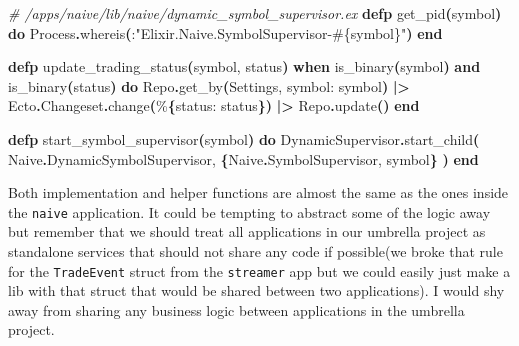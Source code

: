 \documentclass[
  oneside]{book}
\newenvironment{Shaded}{\begin{snugshade}}{\end{snugshade}}
\newcommand{\CommentTok}[1]{\textcolor[rgb]{0.56,0.35,0.01}{\textit{#1}}}
\newcommand{\ConstantTok}[1]{\textcolor[rgb]{0.56,0.35,0.01}{#1}}
\newcommand{\FunctionTok}[1]{\textcolor[rgb]{0.13,0.29,0.53}{\textbf{#1}}}
\newcommand{\KeywordTok}[1]{\textcolor[rgb]{0.13,0.29,0.53}{\textbf{#1}}}
\newcommand{\NormalTok}[1]{#1}
\newcommand{\OperatorTok}[1]{\textcolor[rgb]{0.81,0.36,0.00}{\textbf{#1}}}
\newcommand{\OtherTok}[1]{\textcolor[rgb]{0.56,0.35,0.01}{#1}}
\newcommand{\StringTok}[1]{\textcolor[rgb]{0.31,0.60,0.02}{#1}}
\newcommand{\VariableTok}[1]{\textcolor[rgb]{0.00,0.00,0.00}{#1}}
\begin{document}
\begin{Shaded}
\begin{Highlighting}[]
\CommentTok{\# /apps/naive/lib/naive/dynamic\_symbol\_supervisor.ex}
  \KeywordTok{defp}\NormalTok{ get\_pid}\FunctionTok{(}\NormalTok{symbol}\FunctionTok{)} \KeywordTok{do}
    \ConstantTok{Process}\OperatorTok{.}\NormalTok{whereis}\FunctionTok{(}\NormalTok{:}\StringTok{"Elixir.Naive.SymbolSupervisor{-}}\OtherTok{\#\{}\NormalTok{symbol}\OtherTok{\}}\StringTok{"}\FunctionTok{)}
  \KeywordTok{end}

  \KeywordTok{defp}\NormalTok{ update\_trading\_status}\FunctionTok{(}\NormalTok{symbol, status}\FunctionTok{)}
       \KeywordTok{when}\NormalTok{ is\_binary}\FunctionTok{(}\NormalTok{symbol}\FunctionTok{)} \KeywordTok{and}\NormalTok{ is\_binary}\FunctionTok{(}\NormalTok{status}\FunctionTok{)} \KeywordTok{do}
    \ConstantTok{Repo}\OperatorTok{.}\NormalTok{get\_by}\FunctionTok{(}\ConstantTok{Settings}\NormalTok{, }\VariableTok{symbol:}\NormalTok{ symbol}\FunctionTok{)}
    \OperatorTok{|\textgreater{}} \ConstantTok{Ecto}\OperatorTok{.}\ConstantTok{Changeset}\OperatorTok{.}\NormalTok{change}\FunctionTok{(}\NormalTok{\%}\FunctionTok{\{}\VariableTok{status:}\NormalTok{ status}\FunctionTok{\})}
    \OperatorTok{|\textgreater{}} \ConstantTok{Repo}\OperatorTok{.}\NormalTok{update}\FunctionTok{()}
  \KeywordTok{end}

  \KeywordTok{defp}\NormalTok{ start\_symbol\_supervisor}\FunctionTok{(}\NormalTok{symbol}\FunctionTok{)} \KeywordTok{do}
    \ConstantTok{DynamicSupervisor}\OperatorTok{.}\NormalTok{start\_child}\FunctionTok{(}
      \ConstantTok{Naive}\OperatorTok{.}\ConstantTok{DynamicSymbolSupervisor}\NormalTok{,}
      \FunctionTok{\{}\ConstantTok{Naive}\OperatorTok{.}\ConstantTok{SymbolSupervisor}\NormalTok{, symbol}\FunctionTok{\}}
    \FunctionTok{)}
  \KeywordTok{end}
\end{Highlighting}
\end{Shaded}

Both implementation and helper functions are almost the same as the ones inside the \texttt{naive} application. It could be tempting to abstract some of the logic away but remember that we should treat all applications in our umbrella project as standalone services that should not share any code if possible(we broke that rule for the \texttt{TradeEvent} struct from the \texttt{streamer} app but we could easily just make a lib with that struct that would be shared between two applications). I would shy away from sharing any business logic between applications in the umbrella project.
\end{document}
